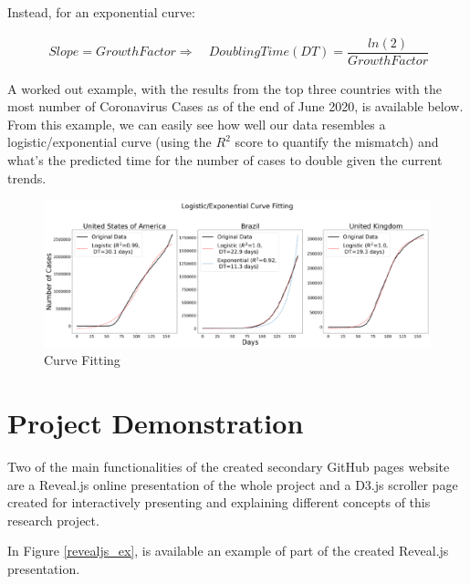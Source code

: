 \begin{appendices}
Instead, for an exponential curve:

\useshortskip
\begin{align}
\ Slope = Growth Factor \Rightarrow\quad Doubling Time (DT) = \dfrac{ln(2)}{Growth Factor}
\end{align}
\useshortskip

A worked out example, with the results from the top three countries with the most number of Coronavirus Cases as of the end of June 2020, is available below. From this example, we can easily see how well our data resembles a logistic/exponential curve (using the $R^{2}$ score to quantify the mismatch) and what's the predicted time for the number of cases to double given the current trends.

\begin{figure}[ht!]%
    \centering
    \includegraphics[width=1\linewidth]{latex/images/fitting.pdf}
    \caption{Curve Fitting}
\end{figure}

\clearpage

\section{Project Demonstration}
\label{dem}

Two of the main functionalities of the created secondary GitHub pages website are a Reveal.js online presentation of the whole project and a D3.js scroller page created for interactively presenting and explaining different concepts of this research project.

In Figure \ref{revealjs_ex}, is available an example of part of the created Reveal.js presentation.


\end{appendices}

